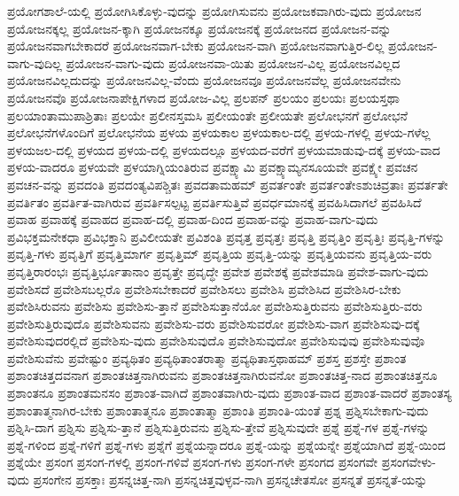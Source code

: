 {ಪ್ರಯೋಗಶಾಲೆ-ಯಲ್ಲಿ
ಪ್ರಯೋಗಿಸಿಕೊಳ್ಳು-ವುದನ್ನು
ಪ್ರಯೋಗಿಸುವನು
ಪ್ರಯೋಜಕವಾಗಿರು-ವುದು
ಪ್ರಯೋಜನ
ಪ್ರಯೋಜನಕ್ಕಲ್ಲ
ಪ್ರಯೋಜನ-ಕ್ಕಾಗಿ
ಪ್ರಯೋಜನಕ್ಕೂ
ಪ್ರಯೋಜನಕ್ಕೆ
ಪ್ರಯೋಜನದ
ಪ್ರಯೋಜನ-ವನ್ನು
ಪ್ರಯೋಜನವಾಗಬೇಕಾದರೆ
ಪ್ರಯೋಜನವಾಗ-ಬೇಕು
ಪ್ರಯೋಜನ-ವಾಗಿ
ಪ್ರಯೋಜನವಾಗುತ್ತಿರ-ಲಿಲ್ಲ
ಪ್ರಯೋಜನ-ವಾಗು-ವುದಿಲ್ಲ
ಪ್ರಯೋಜನ-ವಾಗು-ವುದು
ಪ್ರಯೋಜನವಾ-ಯಿತು
ಪ್ರಯೋಜನ-ವಿಲ್ಲ
ಪ್ರಯೋಜನವಿಲ್ಲದ
ಪ್ರಯೋಜನವಿಲ್ಲದುದನ್ನು
ಪ್ರಯೋಜನವಿಲ್ಲ-ವೆಂದು
ಪ್ರಯೋಜನವೂ
ಪ್ರಯೋಜನವೆಲ್ಲ
ಪ್ರಯೋಜನವೇನು
ಪ್ರಯೋಜನವೊ
ಪ್ರಯೋಜನಾಪೇಕ್ಷಿಗಳಾದ
ಪ್ರಯೋಜ-ವಿಲ್ಲ
ಪ್ರಲಪನ್
ಪ್ರಲಯಂ
ಪ್ರಲಯಃ
ಪ್ರಲಯಸ್ತಥಾ
ಪ್ರಲಯಾಂತಾಮುಪಾಶ್ರಿತಾಃ
ಪ್ರಲಯೇ
ಪ್ರಲೀನಸ್ತಮಸಿ
ಪ್ರಲೀಯಂತೇ
ಪ್ರಲೀಯತೇ
ಪ್ರಲೋಭನಗೆ
ಪ್ರಲೋಭನೆ
ಪ್ರಲೋಭನೆಗಳೊಂದಿಗೆ
ಪ್ರಲೋಭನೆಯ
ಪ್ರಳಯ
ಪ್ರಳಯಕಾಲ
ಪ್ರಳಯಕಾಲ-ದಲ್ಲಿ
ಪ್ರಳಯ-ಗಳಲ್ಲಿ
ಪ್ರಳಯ-ಗಳೆಲ್ಲ
ಪ್ರಳಯಜಲ-ದಲ್ಲಿ
ಪ್ರಳಯದ
ಪ್ರಳಯ-ದಲ್ಲಿ
ಪ್ರಳಯದಲ್ಲೂ
ಪ್ರಳಯದ-ವರೆಗೆ
ಪ್ರಳಯಮಾಡುವು-ದಕ್ಕೆ
ಪ್ರಳಯ-ವಾದ
ಪ್ರಳಯ-ವಾದರೂ
ಪ್ರಳಯವೇ
ಪ್ರಳಯಾಗ್ನಿಯಂತಿರುವ
ಪ್ರವಕ್ಷ್ಯಾಮಿ
ಪ್ರವಕ್ಷ್ಯಾಮ್ಯನಸೂಯವೇ
ಪ್ರವಕ್ಷ್ಯೇ
ಪ್ರವಚನ
ಪ್ರವಚನ-ವನ್ನು
ಪ್ರವದಂತಿ
ಪ್ರವದಂತ್ಯವಿಪಶ್ಚಿತಃ
ಪ್ರವದತಾಮಹಮ್
ಪ್ರವರ್ತಂತೇ
ಪ್ರವರ್ತಂತೇಽಶುಚಿವ್ರತಾಃ
ಪ್ರವರ್ತತೇ
ಪ್ರವರ್ತಿತಂ
ಪ್ರವರ್ತಿತ-ವಾಗಿರುವ
ಪ್ರವರ್ತಿಸಲ್ಪಟ್ಟ
ಪ್ರವರ್ತಿಸುತ್ತಿವೆ
ಪ್ರವರ್ಧಮಾನಕ್ಕೆ
ಪ್ರವಹಿಸಿದಾಗಲೆ
ಪ್ರವಹಿಸಿದೆ
ಪ್ರವಾಹ
ಪ್ರವಾಹಕ್ಕೆ
ಪ್ರವಾಹದ
ಪ್ರವಾಹ-ದಲ್ಲಿ
ಪ್ರವಾಹ-ದಿಂದ
ಪ್ರವಾಹ-ವನ್ನು
ಪ್ರವಾಹ-ವಾಗು-ವುದು
ಪ್ರವಿಭಕ್ತಮನೇಕಧಾ
ಪ್ರವಿಭಕ್ತಾನಿ
ಪ್ರವಿಲೀಯತೇ
ಪ್ರವಿಶಂತಿ
ಪ್ರವೃತ್ತ
ಪ್ರವೃತ್ತಃ
ಪ್ರವೃತ್ತಿ
ಪ್ರವೃತ್ತಿಂ
ಪ್ರವೃತ್ತಿಃ
ಪ್ರವೃತ್ತಿ-ಗಳನ್ನು
ಪ್ರವೃತ್ತಿ-ಗಳು
ಪ್ರವೃತ್ತಿಗೆ
ಪ್ರವೃತ್ತಿಮಾರ್ಗ
ಪ್ರವೃತ್ತಿಮ್
ಪ್ರವೃತ್ತಿಯ
ಪ್ರವೃತ್ತಿ-ಯನ್ನು
ಪ್ರವೃತ್ತಿಯವನು
ಪ್ರವೃತ್ತಿಯ-ವರು
ಪ್ರವೃತ್ತಿರಾರಂಭಃ
ಪ್ರವೃತ್ತಿರ್ಭೂತಾನಾಂ
ಪ್ರವೃತ್ತೇ
ಪ್ರವೃದ್ಧೇ
ಪ್ರವೇಶ
ಪ್ರವೇಶಕ್ಕೆ
ಪ್ರವೇಶಮಾಡಿ
ಪ್ರವೇಶ-ವಾಗು-ವುದು
ಪ್ರವೇಶಿಸದೆ
ಪ್ರವೇಶಿಸಬಲ್ಲರೊ
ಪ್ರವೇಶಿಸಬೇಕಾದರೆ
ಪ್ರವೇಶಿಸಲು
ಪ್ರವೇಶಿಸಿ
ಪ್ರವೇಶಿಸಿದ
ಪ್ರವೇಶಿಸಿರ-ಬೇಕು
ಪ್ರವೇಶಿಸಿರುವನು
ಪ್ರವೇಶಿಸು
ಪ್ರವೇಶಿಸು-ತ್ತಾನೆ
ಪ್ರವೇಶಿಸುತ್ತಾನೆಯೋ
ಪ್ರವೇಶಿಸುತ್ತಿರುವನು
ಪ್ರವೇಶಿಸುತ್ತಿರು-ವರು
ಪ್ರವೇಶಿಸುತ್ತಿರುವುದೊ
ಪ್ರವೇಶಿಸುವನು
ಪ್ರವೇಶಿಸು-ವರು
ಪ್ರವೇಶಿಸುವರೋ
ಪ್ರವೇಶಿಸು-ವಾಗ
ಪ್ರವೇಶಿಸುವು-ದಕ್ಕೆ
ಪ್ರವೇಶಿಸುವುದರಲ್ಲಿದೆ
ಪ್ರವೇಶಿಸು-ವುದು
ಪ್ರವೇಶಿಸುವುದೊ
ಪ್ರವೇಶಿಸುವುದೋ
ಪ್ರವೇಶಿಸುವುವು
ಪ್ರವೇಶಿಸುವುವೊ
ಪ್ರವೇಶಿಸುವೆನು
ಪ್ರವೇಷ್ಟುಂ
ಪ್ರವ್ಯಥಿತಂ
ಪ್ರವ್ಯಥಿತಾಂತರಾತ್ಮಾ
ಪ್ರವ್ಯಥಿತಾಸ್ತಥಾಹಮ್
ಪ್ರಶಸ್ತ
ಪ್ರಶಸ್ತೇ
ಪ್ರಶಾಂತ
ಪ್ರಶಾಂತಚಿತ್ತದವನಾಗ
ಪ್ರಶಾಂತಚಿತ್ತನಾಗಿರುವನು
ಪ್ರಶಾಂತಚಿತ್ತನಾಗಿರುವನೋ
ಪ್ರಶಾಂತಚಿತ್ತ-ನಾದ
ಪ್ರಶಾಂತಚಿತ್ತನೂ
ಪ್ರಶಾಂತನೂ
ಪ್ರಶಾಂತಮನಸಂ
ಪ್ರಶಾಂತ-ವಾಗಿದೆ
ಪ್ರಶಾಂತವಾಗಿರು-ವುದು
ಪ್ರಶಾಂತ-ವಾದ
ಪ್ರಶಾಂತ-ವಾದರೆ
ಪ್ರಶಾಂತಸ್ಯ
ಪ್ರಶಾಂತಾತ್ಮನಾಗಿರ-ಬೇಕು
ಪ್ರಶಾಂತಾತ್ಮನೂ
ಪ್ರಶಾಂತಾತ್ಮಾ
ಪ್ರಶಾಂತಿ
ಪ್ರಶಾಂತಿ-ಯಂತೆ
ಪ್ರಶ್ನ
ಪ್ರಶ್ನಿಸಬೇಕಾಗು-ವುದು
ಪ್ರಶ್ನಿಸಿ-ದಾಗ
ಪ್ರಶ್ನಿಸು
ಪ್ರಶ್ನಿಸು-ತ್ತಾನೆ
ಪ್ರಶ್ನಿಸುತ್ತಿರುವನು
ಪ್ರಶ್ನಿಸು-ತ್ತೇವೆ
ಪ್ರಶ್ನಿಸುವುದೇ
ಪ್ರಶ್ನೆ
ಪ್ರಶ್ನೆ-ಗಳ
ಪ್ರಶ್ನೆ-ಗಳನ್ನು
ಪ್ರಶ್ನೆ-ಗಳಿಂದ
ಪ್ರಶ್ನೆ-ಗಳಿಗೆ
ಪ್ರಶ್ನೆ-ಗಳು
ಪ್ರಶ್ನೆಗೆ
ಪ್ರಶ್ನೆಯನ್ನಾದರೂ
ಪ್ರಶ್ನೆ-ಯನ್ನು
ಪ್ರಶ್ನೆಯನ್ನೇ
ಪ್ರಶ್ನೆಯಾಗಿದೆ
ಪ್ರಶ್ನೆ-ಯಿಂದ
ಪ್ರಶ್ನೆಯೇ
ಪ್ರಸಂಗ
ಪ್ರಸಂಗ-ಗಳಲ್ಲಿ
ಪ್ರಸಂಗ-ಗಳಿವೆ
ಪ್ರಸಂಗ-ಗಳು
ಪ್ರಸಂಗ-ಗಳೇ
ಪ್ರಸಂಗದ
ಪ್ರಸಂಗವೇ
ಪ್ರಸಂಗವೇಳು-ವುದು
ಪ್ರಸಂಗೇನ
ಪ್ರಸಕ್ತಾಃ
ಪ್ರಸನ್ನಚಿತ್ತ-ನಾಗಿ
ಪ್ರಸನ್ನಚಿತ್ತವುಳ್ಳವ-ನಾಗಿ
ಪ್ರಸನ್ನಚೇತಸೋ
ಪ್ರಸನ್ನತೆ
ಪ್ರಸನ್ನತೆ-ಯನ್ನು
}
